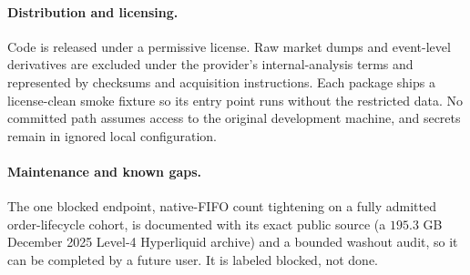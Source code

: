 \paragraph{Distribution and licensing.} Code is released under a permissive license. Raw market
dumps and event-level derivatives are excluded under the provider's internal-analysis terms and
represented by checksums and acquisition instructions. Each package ships a license-clean smoke
fixture so its entry point runs without the restricted data. No committed path assumes access
to the original development machine, and secrets remain in ignored local configuration.

\paragraph{Maintenance and known gaps.} The one blocked endpoint, native-FIFO count
tightening on a fully admitted order-lifecycle cohort, is documented with its exact public
source (a $195.3$ GB December 2025 Level-4 Hyperliquid archive) and a bounded washout audit, so
it can be completed by a future user. It is labeled blocked, not done.

